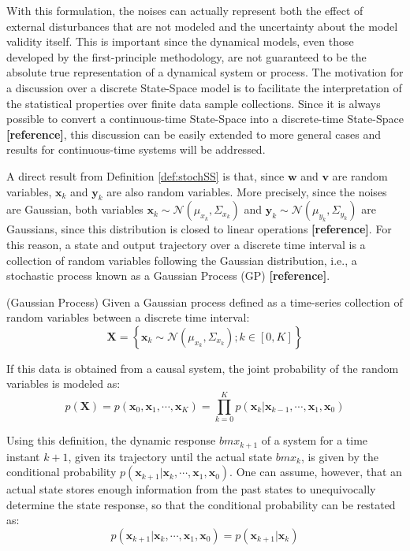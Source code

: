 \documentclass[a4paper,11pt]{book}
\numberwithin{figure}{chapter}
\numberwithin{equation}{chapter}
\numberwithin{table}{chapter}
\theoremstyle{definition}
\newtheorem{definition}{Definition}[chapter]
\newcounter{boxed-theorem}
\newcounter{boxed-definition}
\newenvironment{boxed-definition}[1]
{\begin{shaded} \begin{definition}{#1}}
{\end{definition} \end{shaded}}
\begin{document}
With this formulation, the noises can actually represent both the effect of external disturbances that are not modeled and the uncertainty about the model validity itself. This is important since the dynamical models, even those developed by the first-principle methodology, are not guaranteed to be the absolute true representation of a dynamical system or process. The motivation for a discussion over a discrete State-Space model is to facilitate the interpretation of the statistical properties over finite data sample collections. Since it is always possible to convert a continuous-time State-Space into a discrete-time State-Space \textbf{[reference]}, this discussion can be easily extended to more general cases and results for continuous-time systems will be addressed. 

A direct result from Definition \ref{def:stochSS} is that, since $\bm{w}$ and $\bm{v}$ are random variables, $\bm{x}_k$ and $\bm{y}_k$ are also random variables. More precisely, since the noises are Gaussian, both variables $\bm{x}_k \sim \mathcal{N}(\mu_{x_k}, \Sigma_{x_k})$ and $\bm{y}_k \sim \mathcal{N}(\mu_{y_k}, \Sigma_{y_k})$ are Gaussians, since this distribution is closed to linear operations \textbf{[reference]}. For this reason, a state and output trajectory over a discrete time interval is a collection of random variables following the Gaussian distribution, i.e., a stochastic process known as a Gaussian Process (GP) \textbf{[reference]}.

\begin{boxed-definition}{(Gaussian Process)} \label{def:gaussianProcess}
	Given a Gaussian process defined as a time-series collection of random variables between a discrete time interval:
	\begin{equation}
		\bm{X} = \left\{ \bm{x}_k \sim \mathcal{N}(\mu_{x_k}, \Sigma_{x_k}) ; k \in [0, K] \right\}
	\end{equation}
	
	If this data is obtained from a causal system, the joint probability of the random variables is modeled as:
	\begin{equation}
		p(\bm{X}) = p(\bm{x}_0, \bm{x}_1, \cdots, \bm{x}_K) = \prod_{k=0}^K p(\bm{x}_k | \bm{x}_{k-1}, \cdots, \bm{x}_1, \bm{x}_0)
	\end{equation}
\end{boxed-definition}

Using this definition, the dynamic response $bm{x}_{k+1}$ of a system for a time instant $k+1$, given its trajectory until the actual state $bm{x}_{k}$, is given by the conditional probability $p(\bm{x}_{k+1} | \bm{x}_{k}, \cdots, \bm{x}_1, \bm{x}_0)$. One can assume, however, that an actual state stores enough information from the past states to unequivocally determine the state response, so that the conditional probability can be restated as:
\begin{equation}
	p(\bm{x}_{k+1} | \bm{x}_{k}, \cdots, \bm{x}_1, \bm{x}_0) =  p(\bm{x}_{k+1} | \bm{x}_{k})
\end{equation}
\end{document}
